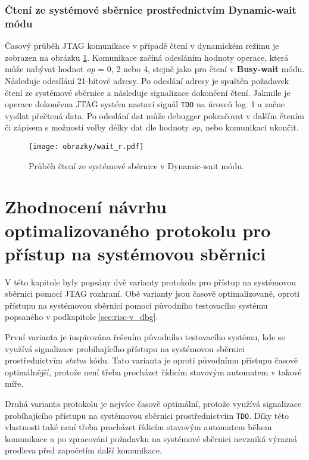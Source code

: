 \subsubsection{Čtení ze systémové sběrnice prostřednictvím Dynamic-wait módu}
Časový průběh JTAG komunikace v případě čtení v dynamickém režimu je zobrazen na obrázku \ref{fig:wait_r}. Komunikace začíná odesláním hodnoty operace, která může nabývat hodnot \textit{op} = 0, 2 nebo 4, stejně jako pro čtení v \textbf{Busy-wait} módu. Následuje odesílání 21-bitové adresy. Po odeslání adresy je spuštěn požadavek čtení ze systémové sběrnice a následuje signalizace dokončení čtení. Jakmile je operace dokončena \acs{JTAG} systém nastaví signál \texttt{\acs{TDO}} na úroveň log. 1 a začne vysílat přečtená data. Po odeslání dat může debugger pokračovat v dalším čtením či zápisem s možností volby délky dat dle hodnoty \textit{op}, nebo komunikaci ukončit. 

\begin{figure}[!h]
  \begin{center}
    \texttt{[image: obrazky/wait\_r.pdf]}
  \end{center}
  \caption{Průběh čtení ze systémové sběrnice v Dynamic-wait módu.}
	\label{fig:wait_r}
\end{figure}

\section{Zhodnocení návrhu optimalizovaného protokolu pro přístup na systémovou sběrnici}
V této kapitole byly popsány dvě varianty protokolu pro přístup na systémovou sběrnici pomocí \acs{JTAG} rozhraní. Obě varianty jsou časově optimalizované, oproti přístupu na systémovou sběrnici pomocí původního testovacího systému popsaného v podkapitole \ref{sec:risc-v_dbg}.

První varianta je inspirována řešením původního testovacího systému, kde se využívá signalizace probíhajícího přístupu na systémovou sběrnici prostřednictvím \textit{status} kódu. Tato varianta je oproti původnímu přístupu časově optimálnější, protože není třeba procházet řídicím stavovým automatem
 v takové míře.

Druhá varianta protokolu je nejvíce časově optimální, protože využívá signalizace probíhajícího přístupu na systémovou sběrnici prostřednictvím \texttt{\acs{TDO}}. Díky této vlastnosti také není třeba procházet řídicím stavovým automatem během komunikace a po zpracování požadavku na systémové sběrnici nevzniká výrazná prodleva před započetím další komunikace.

